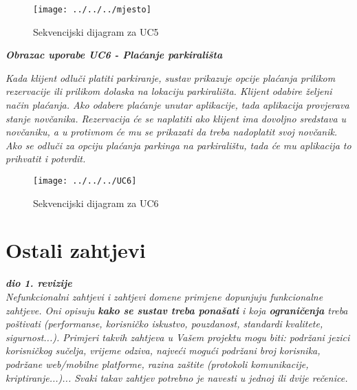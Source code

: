 				   
				    \begin{figure}[hbt!]
				    	\centering
				    	\texttt{[image: ../../../mjesto]}
				    	\caption{Sekvencijski dijagram za UC5}
				    	\label{fig:mjesto}
				    \end{figure}
				    
				    
				    
				    
				    
				    
				    
				    
				    
				    
			     	
				    \textbf{\textit{Obrazac uporabe UC6 - Plaćanje parkirališta}}
				    				
				     \textit{Kada klijent odluči platiti parkiranje, sustav prikazuje opcije plaćanja prilikom rezervacije ili prilikom dolaska na lokaciju parkirališta. Klijent odabire željeni način plaćanja. Ako odabere plaćanje unutar aplikacije, tada aplikacija provjerava stanje novčanika. Rezervacija će se naplatiti ako klijent ima dovoljno sredstava u novčaniku, a u protivnom će mu se prikazati da treba nadoplatit svoj novčanik. Ako se odluči za opciju plaćanja parkinga na parkiralištu, tada će mu aplikacija to prihvatit i potvrdit.}
				     
				     
				     
				      \begin{figure}[hbt!]
				      	\centering
				      	\texttt{[image: ../../../UC6]}
				      	\caption{Sekvencijski dijagram za UC6}
				      	\label{fig:uc6}
				      \end{figure}
				      
				    
				    
				    
		   	\eject
	
		\section{Ostali zahtjevi}
		
			\textbf{\textit{dio 1. revizije}}\\
		 
			 \textit{Nefunkcionalni zahtjevi i zahtjevi domene primjene dopunjuju funkcionalne zahtjeve. Oni opisuju \textbf{kako se sustav treba ponašati} i koja \textbf{ograničenja} treba poštivati (performanse, korisničko iskustvo, pouzdanost, standardi kvalitete, sigurnost...). Primjeri takvih zahtjeva u Vašem projektu mogu biti: podržani jezici korisničkog sučelja, vrijeme odziva, najveći mogući podržani broj korisnika, podržane web/mobilne platforme, razina zaštite (protokoli komunikacije, kriptiranje...)... Svaki takav zahtjev potrebno je navesti u jednoj ili dvije rečenice.}
			 
			 
			 
	